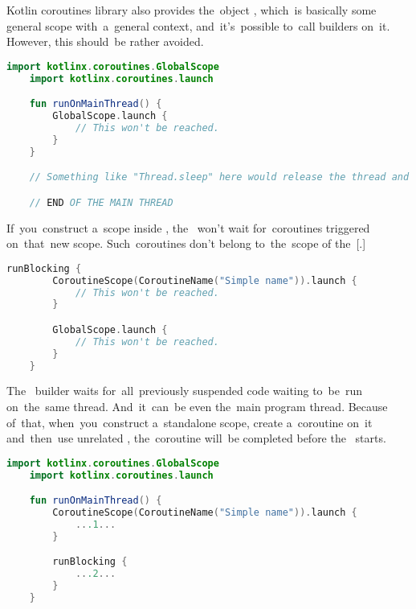 \noindent Kotlin coroutines library also provides the~object , which~is basically some general scope with~a~general context, and~it's~possible to~call builders on~it.
However, this should~be rather avoided.

\begin{lstlisting}[language=Kotlin]
    import kotlinx.coroutines.GlobalScope
    import kotlinx.coroutines.launch

    fun runOnMainThread() {
        GlobalScope.launch {
            // This won't be reached.
        }
    }

    // Something like "Thread.sleep" here would release the thread and the callback would run.

    // END OF THE MAIN THREAD
\end{lstlisting}

\warning If~you~construct a~scope inside , the~ won't wait for~coroutines triggered on~that~new scope.
Such~coroutines don't belong to~the~scope of the~[.]

\begin{lstlisting}[language=Kotlin]
    runBlocking {
        CoroutineScope(CoroutineName("Simple name")).launch {
            // This won't be reached.
        }

        GlobalScope.launch {
            // This won't be reached.
        }
    }
\end{lstlisting}

\note The~ builder waits for~all~previously suspended code waiting to~be~run on~the~same thread.
And~it~can~be even the~main program thread.
Because of~that, when~you~construct a~standalone scope, create a~coroutine on~it and~then~use unrelated , the~coroutine will~be completed before the~ starts.

\begin{lstlisting}[language=Kotlin, title={Numbers represent the~order of~execution}]
    import kotlinx.coroutines.GlobalScope
    import kotlinx.coroutines.launch

    fun runOnMainThread() {
        CoroutineScope(CoroutineName("Simple name")).launch {
            ...1...
        }

        runBlocking {
            ...2...
        }
    }
\end{lstlisting}

